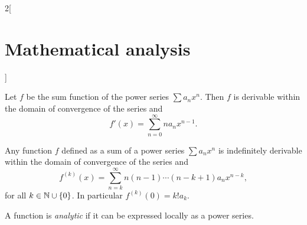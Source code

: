 \documentclass[../../../main.tex]{subfiles}
\begin{document}
\begin{multicols}{2}[\section{Mathematical analysis}]
\begin{corollary}
  \end{corollary}
  \begin{corollary}
    Let $f$ be the sum function of the power series $\sum a_nx^n$. Then $f$ is derivable within the domain of convergence of the series and $$f'(x)=\sum_{n=0}^\infty na_nx^{n-1}.$$
  \end{corollary}
  \begin{corollary}
    Any function $f$ defined as a sum of a power series $\sum a_nx^n$ is indefinitely derivable within the domain of convergence of the series and $$f^{(k)}(x)=\sum_{n=k}^\infty n(n-1)\cdots(n-k+1)a_nx^{n-k},$$
    for all $k\in\mathbb{N} \cup\{0\}$. In particular $f^{(k)}(0)=k!a_k$.
  \end{corollary}
  \begin{definition}
    A function is \textit{analytic} if it can be expressed locally as a power series.
  \end{definition}

\end{multicols}
\end{document}
